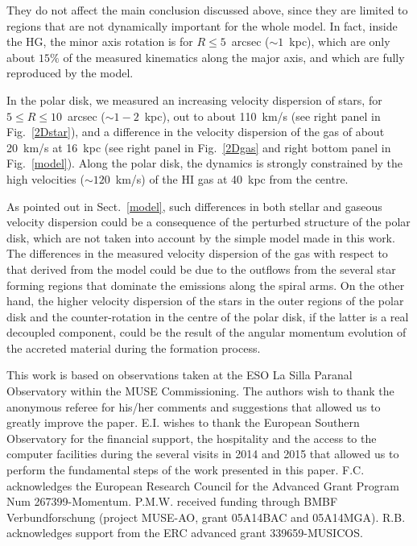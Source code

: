 \documentclass{aa}
\begin{document}
  They do not affect the main conclusion discussed above, since they
  are limited to regions that are not dynamically important for the
  whole model. In fact, inside the HG, the minor axis rotation is for
  $R\le 5$~arcsec ($\sim 1$~kpc), which are only  about  $15\%$
  of the measured kinematics along the major axis, and which are fully reproduced by the model.

  In the polar disk, we measured an increasing velocity dispersion of
  stars, for $5 \le R \le 10$~arcsec ($\sim 1 - 2$~kpc), out to about
  110~km/s (see right panel in Fig.~\ref{2Dstar}), and a difference in
  the velocity dispersion of the gas of about 20~km/s at 16~kpc (see
  right panel in Fig.~\ref{2Dgas} and right bottom panel in  Fig.~\ref{model}). Along the polar disk, the dynamics is strongly
  constrained by the high velocities ($\sim 120$~km/s) of the H{\small I} gas at 40~kpc from the centre.

  As pointed out in Sect.~\ref{model}, such differences in both stellar
  and gaseous velocity dispersion could be a consequence of the
  perturbed structure of the polar disk, which are not taken into
  account by the simple model made in this work. The differences in
  the measured velocity dispersion of the gas with respect to that
  derived from the model could be due to the outflows from the several
  star forming regions that dominate the emissions along the spiral
  arms. On the other hand, the higher velocity dispersion of the stars
  in the outer regions of the polar disk and the counter-rotation in
  the centre of the polar disk, if the latter is a real decoupled
  component, could be the result of the angular momentum evolution of
  the accreted material during the formation process. 
 








\begin{acknowledgements}
  This work is based on observations taken at the ESO La Silla Paranal
  Observatory within the MUSE Commissioning.   The authors wish to
    thank the anonymous referee for his/her comments and suggestions
    that allowed us to greatly improve  the paper. E.I. wishes to thank the
  European Southern Observatory for the financial support, the
  hospitality and the access to the computer facilities during the
  several visits in 2014 and 2015 that allowed us to perform the 
  fundamental steps of the work presented in this
  paper. F.C. acknowledges the European Research Council for
 the Advanced Grant Program Num 267399-Momentum. P.M.W. received funding through BMBF Verbundforschung (project
  MUSE-AO, grant 05A14BAC and 05A14MGA). R.B. acknowledges support from the ERC advanced grant
  339659-MUSICOS.
\end{acknowledgements}





\end{document}
